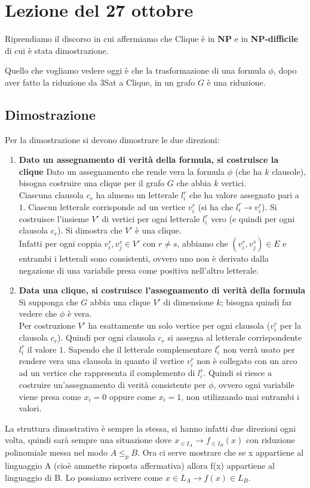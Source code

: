 \section{Lezione del 27 ottobre}
Riprendiamo il discorso in cui affermiamo che Clique è in \textbf{NP} e in \textbf{NP-difficile} di cui è stata dimostrazione.

Quello che vogliamo vedere oggi è che la trasformazione di una formula $\phi$, dopo aver fatto la riduzione da 3Sat a Clique, in un grafo $G$ è una riduzione.
\subsection{Dimostrazione}
Per la dimostrazione si devono dimostrare le due direzioni:
\begin{enumerate}
\itemsep1pt\parskip0pt
    \item \textbf{Dato un assegnamento di verità della formula, si costruisce la clique} Dato un assegnamento che rende vera la formula $\phi$ (che ha $k$ clausole), bisogna costruire una clique per il grafo $G$ che abbia $k$ vertici.\\ Ciascuna clausola $c_r$ ha almeno un letterale $l_i^r$ che ha valore assegnato pari a $1$. Ciascun letterale corrisponde ad un vertice $v_i^r$ (si ha che $l_i^r \to v_i^r$). Si costruisce l'insieme $V'$ di vertici per ogni letterale $l_i^r$ vero (e quindi per ogni clausola $c_r$). Si dimostra che $V'$ è una clique. \\ Infatti per ogni coppia $v_i^r, v_j^s \in V'$ con $r \neq s$, abbiamo che $(v_i^r, v_j^s) \in E$ e entrambi i letterali sono consistenti, ovvero uno non è derivato dalla negazione di una variabile presa come positiva nell'altro letterale.
    \item \textbf{Data una clique, si costruisce l'assegnamento di verità della formula} Si supponga che $G$ abbia una clique $V'$ di dimensione $k$; bisogna quindi far vedere che $\phi$ è vera.\\ Per costruzione $V'$ ha esattamente un solo vertice per ogni clausola ($v_i^r$ per la clausola $c_r$). Quindi per ogni clausola $c_r$ si assegna al letterale corrispondente $l_i^r$ il valore $1$. Sapendo che il letterale complementare $l_i^r$ non verrà usato per rendere vera una clausola in quanto il vertice $v_i^r$ non è collegato con un arco ad un vertice che rappresenta il complemento di $l_i^r$. Quindi si riesce a costruire un'assegnamento di verità consistente per $\phi$, ovvero ogni variabile viene presa come $x_i = 0$ oppure come $x_i = 1$, non utilizzando mai entrambi i valori.
\end{enumerate}
La struttura dimostrativa è sempre la stessa, si hanno infatti due direzioni ogni volta, quindi sarà sempre una situazione dove $\displaystyle x_{\in I_A} \to f_{\in I_B}(x)$ con riduzione polinomiale messa nel modo $A \leq_p B$. Ora ci serve mostrare che se x appartiene al linguaggio A (cioè ammette risposta affermativa) allora f(x) appartiene al linguaggio di B. Lo possiamo scrivere come $x \in L_A \to f(x) \in L_B$.


